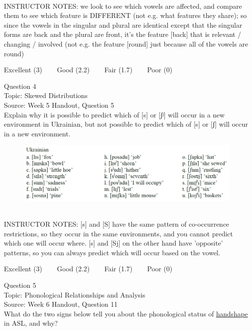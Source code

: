 \documentclass[12pt]{article}
\begin{document}
~\\
INSTRUCTOR NOTES: we look to see which vowels are affected, and compare them to see which feature is DIFFERENT (not e.g. what features they share); so since the vowels in the singular and plural are identical except that the singular forms are back and the plural are front, it's the feature [back] that is relevant / changing / involved (not e.g. the feature [round] just because all of the vowels are round)


\vfill
Excellent (3) ~~~ Good (2.2) ~~~ Fair (1.7) ~~~ Poor (0)
\newpage

{\large Question 4}\\

Topic: Skewed Distributions\\
Source: Week 5 Handout, Question 5\\

Explain why it is possible to predict which of [s] or [ʃʲ] will occur in a new environment in Ukrainian, but not possible to predict which of [s] or [ʃ] will occur in a new environment.\\

\begin{figure}[H]
\includegraphics{../images/ukrainian.png}
\end{figure}

~\\
INSTRUCTOR NOTES: [s] and [S] have the same pattern of co-occurrence restrictions, so they occur in the same environments, and you cannot predict which one will occur where. [s] and [Sj] on the other hand have 'opposite' patterns, so you can always predict which will occur based on the vowel.


\vfill
Excellent (3) ~~~ Good (2.2) ~~~ Fair (1.7) ~~~ Poor (0)
\newpage

{\large Question 5}\\

Topic: Phonological Relationships and Analysis\\
Source: Week 6 Handout, Question 11\\

What do the two signs below tell you about the phonological status of \underline{handshape} in ASL, and why?\\
\end{document}
